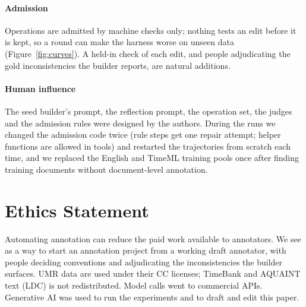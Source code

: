 \paragraph{Admission} Operations are admitted by machine checks only; nothing tests an edit before it is kept, so a round can make the harness worse on unseen data (Figure~\ref{fig:curves}). A held-in check of each edit, and people adjudicating the gold inconsistencies the builder reports, are natural additions.

\paragraph{Human influence} The seed builder's prompt, the reflection prompt, the operation set, the judges and the admission rules were designed by the authors. During the runs we changed the admission code twice (rule steps get one repair attempt; helper functions are allowed in tools) and restarted the trajectories from scratch each time, and we replaced the English and TimeML training pools once after finding training documents without document-level annotation.

\section*{Ethics Statement}
Automating annotation can reduce the paid work available to annotators. We see \sys as a way to start an annotation project from a working draft annotator, with people deciding conventions and adjudicating the inconsistencies the builder surfaces. UMR data are used under their CC licenses; TimeBank and AQUAINT text (LDC) is not redistributed. Model calls went to commercial APIs. Generative AI was used to run the experiments and to draft and edit this paper.
